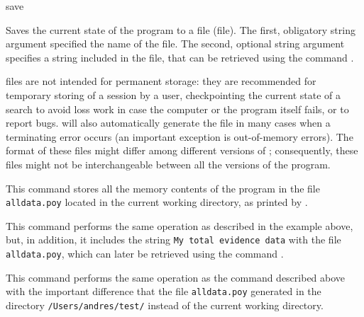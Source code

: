 \begin{command}{save}{}

	\syntax{\obligatory{(\poystring \optional{, \poystring})}}

	\begin{poydescription}
            Saves the current \poy state of the program to a file (\poy file). The first, obligatory string argument
            specified the name of the \poy file. The second, optional string argument specifies a
            string included in the \poy file, that can be retrieved using the command . 

            \poy files are not intended for permanent storage: they are recommended
            for temporary storing of a \poy session by a user, checkpointing the
            current state of a search to avoid loss work in case the computer or the
            program itself fails, or to report bugs. \poy will also automatically
            generate the file in many cases when a terminating error occurs (an
            important exception is out-of-memory errors). The format of these files might differ among different versions of \poy; consequently, these files might not be interchangeable between all the versions of the program.
	\end{poydescription}

    \begin{poyexamples}
            {This command stores all the memory contents of the program in the file
            \texttt{alldata.poy} located in the current working directory, as
            printed by .}

            {This command performs the same operation as described in the example above,
            but, in addition, it includes the string \texttt{My total
            evidence data} with the file \texttt{alldata.poy},
            which can later be retrieved using the command .}

            {This command performs the same operation as the command described above
            with the important difference that the file \texttt{alldata.poy} generated in the
            directory \texttt{/Users/andres/test/} instead of the current working directory.}
    \end{poyexamples}

    \begin{poyalso}
    \end{poyalso}

\end{command}

